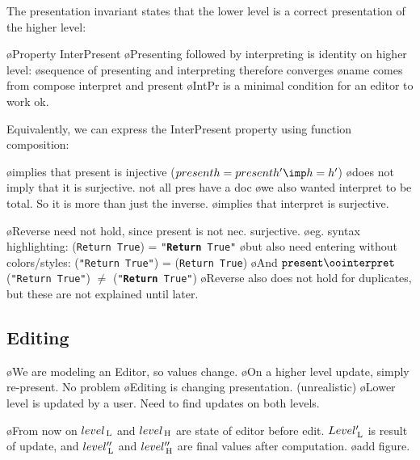 
The presentation invariant states that the lower level is a correct presentation of the higher level:



\bl
\o Property {\sc InterPresent} 
\o Presenting followed by interpreting is identity on higher level: 
\o sequence of presenting and interpreting therefore converges
\o name comes from compose interpret and present
\o IntPr is a minimal condition for an editor to work ok.
\el


Equivalently, we can express the {\sc InterPresent} property using function composition: 


\bl
\o implies that present is injective ($present h = present h' \imp h = h'$)
\o does not imply that it is surjective. not all pres have a doc
\o we also wanted interpret to be total. So it is more than just the inverse. 
\o implies that interpret is surjective.
\el

\bl
\o Reverse need not hold, since present is not nec. surjective.
\o eg. syntax highlighting: \present ({\tt Return True}) = {\tt "{\bf Return} True"}
\o but also need entering without colors/styles: \interpret ({\tt "Return True"}) = ({\tt Return True})
\o And $\present \oo \interpret$ ({\tt "Return True"}) $\neq$ ({\tt "{\bf Return} True"}) 
\o Reverse also does not hold for duplicates, but these are not explained until later.
\el


\subsection{Editing}



\bl
\o We are modeling an Editor, so values change.
\o On a higher level update, simply re-present. No problem
\o Editing is changing presentation. (unrealistic)
\o Lower level is updated by a user. Need to find updates on both levels.
\el

\bl
\o From now on $level_{\, \mathrm L}$ and $level_{\, \mathrm H}$ are state of editor before edit. $Level'_{\, \mathrm L}$ is result of update, and  $level''_{\, \mathrm L}$ and $level''_{\, \mathrm H}$ are final values after computation.
\o add figure.
\el

